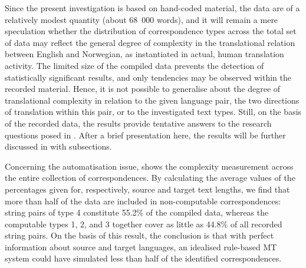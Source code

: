 \documentclass[output=paper]{LSP/langsci}
\begin{document}
Since the present investigation is based on hand-coded material, the data are of a relatively modest quantity (about 68~000 words), and it will remain a mere speculation whether the distribution of correspondence types across the total set of data may reflect the general degree of complexity in the translational relation between English and Norwegian, as instantiated in actual, human translation activity. The limited size of the compiled data prevents the detection of statistically significant results, and only tendencies may be observed within the recorded material. Hence, it is not possible to generalise about the degree of translational complexity in relation to the given language pair, the two directions of translation within this pair, or to the investigated text types. Still, on the basis of the recorded data, the results provide tentative answers to the research questions posed in . After a brief presentation here, the results will be further discussed in  with subsections.

Concerning the automatisation issue,  shows the complexity measurement across the entire collection of correspondences. By calculating the average values of the percentages given for, respectively, source and target text lengths, we find that more than half of the data are included in non-computable correspondences: string pairs of type 4 constitute 55.2\% of the compiled data, whereas the computable types 1, 2, and 3 together cover as little as 44.8\% of all recorded string pairs. On the basis of this result, the conclusion is that with perfect information about source and target languages, an idealised rule-based MT system could have simulated less than half of the identified correspondences.

\begin{table}
\caption{The global distribution of correspondence types in the investigated texts.}
\label{tab:thunes:2}
\end{table}
\end{document}
